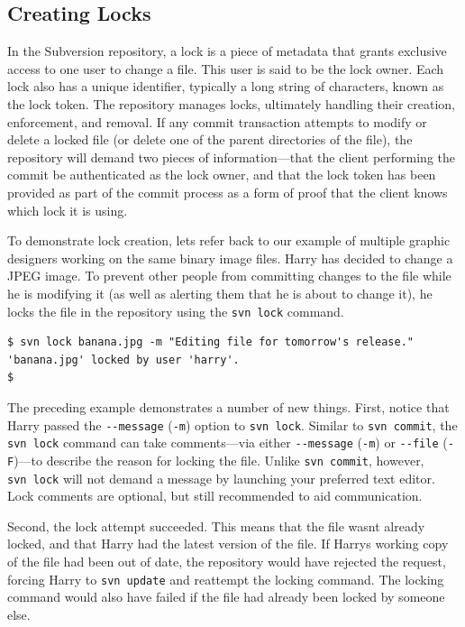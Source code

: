 \subsection{Creating Locks}\label{svn.advanced.locking.creation}

In the Subversion repository, a lock is a piece of metadata that grants
exclusive access to one user to change a file. This user is said to be
the lock owner. Each lock also has a unique identifier, typically a long
string of characters, known as the lock token. The repository manages
locks, ultimately handling their creation, enforcement, and removal. If
any commit transaction attempts to modify or delete a locked file (or
delete one of the parent directories of the file), the repository will
demand two pieces of information---that the client performing the commit
be authenticated as the lock owner, and that the lock token has been
provided as part of the commit process as a form of proof that the
client knows which lock it is using.

To demonstrate lock creation, let\textquotesingle s refer back to our
example of multiple graphic designers working on the same binary image
files. Harry has decided to change a JPEG image. To prevent other people
from committing changes to the file while he is modifying it (as well as
alerting them that he is about to change it), he locks the file in the
repository using the \texttt{svn\ lock} command.

\begin{verbatim}
$ svn lock banana.jpg -m "Editing file for tomorrow's release."
'banana.jpg' locked by user 'harry'.
$
\end{verbatim}

The preceding example demonstrates a number of new things. First, notice
that Harry passed the \texttt{-\/-message} (\texttt{-m}) option to
\texttt{svn\ lock}. Similar to \texttt{svn\ commit}, the
\texttt{svn\ lock} command can take comments---via either
\texttt{-\/-message} (\texttt{-m}) or \texttt{-\/-file}
(\texttt{-F})---to describe the reason for locking the file. Unlike
\texttt{svn\ commit}, however, \texttt{svn\ lock} will not demand a
message by launching your preferred text editor. Lock comments are
optional, but still recommended to aid communication.

Second, the lock attempt succeeded. This means that the file
wasn\textquotesingle t already locked, and that Harry had the latest
version of the file. If Harry\textquotesingle s working copy of the file
had been out of date, the repository would have rejected the request,
forcing Harry to \texttt{svn\ update} and reattempt the locking command.
The locking command would also have failed if the file had already been
locked by someone else.

